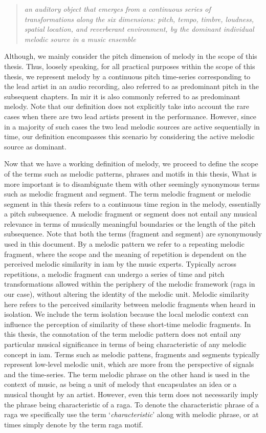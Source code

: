 \blockquote{\textit{an auditory object that emerges from a continuous series of transformations along the six dimensions: pitch, tempo, timbre, loudness, spatial location, and reverberant environment, by the dominant individual melodic source in a music ensemble}}. 

Although, we mainly consider the pitch dimension of melody in the scope of this thesis. Thus, loosely speaking, for all practical purposes within the scope of this thesis, we represent melody by a continuous pitch time-series corresponding to the lead artist in an audio recording, also referred to as predominant pitch in the subsequent chapters. In \gls{mir} it is also commonly referred to as predominant melody. Note that our definition does not explicitly take into account the rare cases when there are two lead artists present in the performance. However, since in a majority of such cases the two lead melodic sources are active sequentially in time, our definition encompasses this scenario by considering the active melodic source as dominant.

Now that we have a working definition of melody, we proceed to define the scope of the terms such as melodic patterns, phrases and motifs in this thesis, What is more important is to disambiguate them with other seemingly synonymous terms such as melodic fragment and segment. The term melodic fragment or melodic segment in this thesis refers to a continuous time region in the melody, essentially a pitch subsequence. A melodic fragment or segment does not entail any musical relevance in terms of musically meaningful boundaries or the length of the pitch subsequence. Note that both the terms (fragment and segment) are synonymously used in this document. By a melodic pattern we refer to a repeating melodic fragment, where the scope and the meaning of repetition is dependent on the perceived melodic similarity in \gls{iam} by the music experts. Typically across repetitions, a melodic fragment can undergo a series of time and pitch transformations allowed within the periphery of the melodic framework (\gls{raga} in our case), without altering the identity of the melodic unit. Melodic similarity here refers to the perceived similarity between melodic fragments when heard in isolation. We include the term isolation because the local melodic context can influence the perception of similarity of these short-time melodic fragments. In this thesis, the connotation of the term melodic pattern does not entail any particular musical significance in terms of being characteristic of any melodic concept in \gls{iam}. Terms such as melodic pattens, fragments and segments typically represent low-level melodic unit, which are more from the perspective of signals and the time-series. The term melodic phrase on the other hand is used in the context of music, as being a unit of melody that encapsulates an idea or a musical thought by an artist. However, even this term does not necessarily imply the phrase being characteristic of a \gls{raga}. To denote the characteristic phrase of a \gls{raga} we specifically use the term `\textit{characteristic}' along with melodic phrase, or at times simply denote by the term \gls{raga} motif. 

